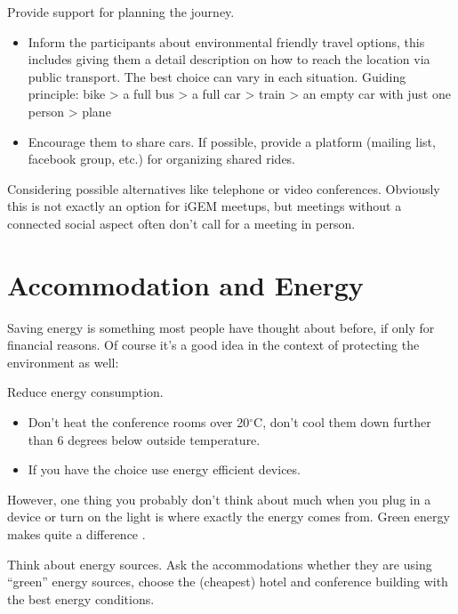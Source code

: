 \begin{suggest}{Provide support for planning the journey.}
	\vspace{-2\topsep}
	\begin{itemize}
		\item Inform the participants about environmental friendly travel options, this includes giving them a detail description on how to reach the location via public transport. The best choice can vary in each situation. Guiding principle: bike > a full bus > a full car > train > an empty car with just one person > plane
		\item Encourage them to share cars. If possible, provide a platform (mailing list, facebook group, etc.) for organizing shared rides.
	\end{itemize}	
\end{suggest}

\begin{suggest}{Considering possible alternatives like telephone or video conferences.}
	Obviously this is not exactly an option for iGEM meetups, but meetings without a connected social aspect often don't call for a meeting in person.
\end{suggest}

\section{Accommodation and Energy}

Saving energy is something most people have thought about before, if only for financial reasons. Of course it's a good idea in the context of protecting the environment as well:

\begin{suggest}{Reduce energy consumption.}
	\vspace{-2\topsep}
	\begin{itemize}
		\item Don't heat the conference rooms over 20$^\circ$C, don't cool them down further than 6 degrees below outside temperature.
		\item If you have the choice use energy efficient devices.
	\end{itemize}	
\end{suggest}

However, one thing you probably don't think about much when you plug in a device or turn on the light is where exactly the energy comes from. Green energy makes quite a difference \cite{energy}.

\begin{suggest}{Think about energy sources.}
	Ask the accommodations whether they are using ``green'' energy sources, choose the (cheapest) hotel and conference building with the best energy conditions.
\end{suggest}

